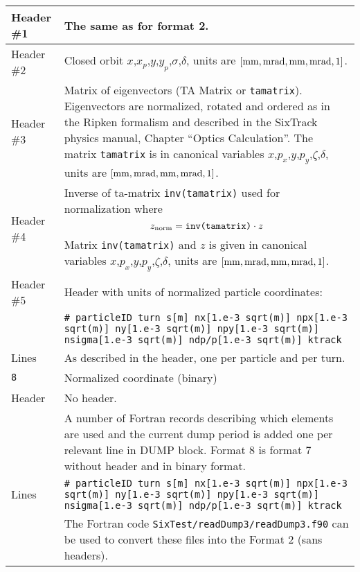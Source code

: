 \begin{center}
\begin{longtable}{|p{1.8cm}|p{13.8cm}|}
        \hline
        Header \#1 & The same as for format 2.\\
        \hline
        Header \#2 & Closed orbit  $x$,$x_p$,$y$,$y_p$,$\sigma$,$\delta$, units are $[\rm mm,mrad,mm,mrad,1]$.\\
        \hline
        Header \#3 & Matrix of eigenvectors (TA Matrix or \texttt{tamatrix}). Eigenvectors are normalized, rotated and ordered as in the Ripken formalism and described in the SixTrack physics manual, Chapter ``Optics Calculation''. The matrix \texttt{tamatrix} is in canonical variables $x$,$p_x$,$y$,$p_y$,$\zeta$,$\delta$, units are $[\rm mm,mrad,mm,mrad,1]$.\index{TA Matrix} \\
        \hline
        Header \#4 & Inverse of ta-matrix \texttt{inv(tamatrix)} used for normalization where
        \begin{equation}
            z_{\rm norm}=\texttt{inv(tamatrix)}\cdot z
        \end{equation}
        Matrix \texttt{inv(tamatrix)} and $z$ is given in canonical variables $x$,$p_x$,$y$,$p_y$,$\zeta$,$\delta$, units are $[\rm mm,mrad,mm,mrad,1]$.\\
        \hline
        Header \#5 & Header with units of normalized particle coordinates:\\
                   & \texttt{\# particleID turn s[m] nx[1.e-3 sqrt(m)] npx[1.e-3 sqrt(m)] ny[1.e-3 sqrt(m)] npy[1.e-3 sqrt(m)] nsigma[1.e-3 sqrt(m)] ndp/p[1.e-3 sqrt(m)] ktrack} \\
        \hline
        Lines      & As described in the header, one per particle and per turn.\\
        \hline
        \rowcolor{blue!15}
        \texttt{8} & Normalized coordinate (binary)\\
        \hline
        Header  & No header.\vspace{1mm} \\
                & A number of Fortran records describing which elements are used and the current dump period is added one per relevant line in DUMP block. Format 8 is format 7 without header and in binary format.\\
        \hline
        Lines   & \texttt{\# particleID turn s[m] nx[1.e-3 sqrt(m)] npx[1.e-3 sqrt(m)] ny[1.e-3 sqrt(m)] npy[1.e-3 sqrt(m)] nsigma[1.e-3 sqrt(m)] ndp/p[1.e-3 sqrt(m)] ktrack}\vspace{1mm} \\
                & The Fortran code \texttt{SixTest/readDump3/readDump3.f90} can be used to convert these files into the Format 2 (sans headers). \\

\end{longtable}
\end{center}

